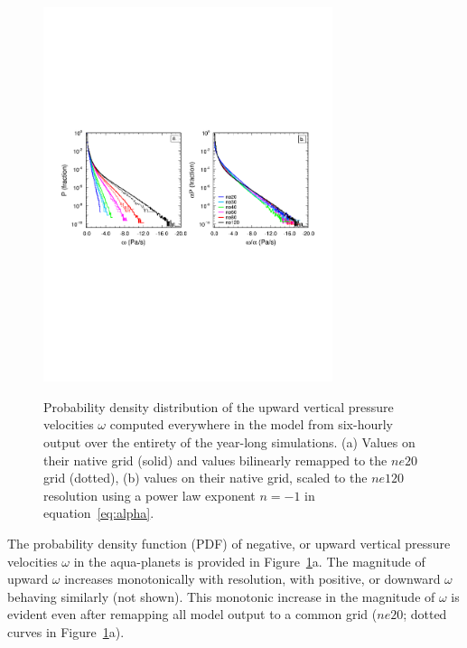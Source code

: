 \documentclass[times]{qjrms4}
\begin{document}
\begin{figure}
\begin{center}
\noindent\includegraphics[width=20pc,angle=0]{figs/temp_2pdf.pdf}\\
\end{center}
\caption{Probability density distribution of the upward vertical pressure velocities $\omega$ computed everywhere in the model from six-hourly output over the entirety of the year-long simulations. (a) Values on their native grid (solid) and values bilinearly remapped to the $ne20$ grid (dotted), (b) values on their native grid, scaled to the $ne120$ resolution using a power law exponent $n=-1$ in equation~\ref{eq:alpha}.}
\label{fig:2pdf}
\end{figure}

The probability density function (PDF) of negative, or upward vertical pressure velocities $\omega$ in the aqua-planets is provided in Figure~\ref{fig:2pdf}a. The magnitude of upward $\omega$ increases monotonically with resolution, with positive, or downward $\omega$ behaving similarly (not shown). This monotonic increase in the magnitude of $\omega$ is evident even after remapping all model output to a common grid ($ne20$; dotted curves in Figure~\ref{fig:2pdf}a).
\end{document}
